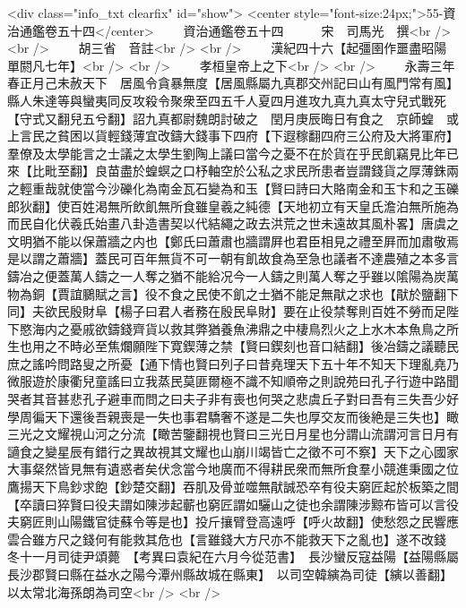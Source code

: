 <div class="info_txt clearfix" id="show">
<center style="font-size:24px;">55-資治通鑑卷五十四</center>
  　　資治通鑑卷五十四　　　宋　司馬光　撰<br />
<br />
　　胡三省　音註<br />
<br />
　　漢紀四十六【起彊圉作噩盡昭陽單閼凡七年】<br />
<br />
　　孝桓皇帝上之下<br />
<br />
　　永壽三年春正月己未赦天下　居風令貪暴無度【居風縣屬九真郡交州記曰山有風門常有風】縣人朱達等與蠻夷同反攻殺令聚衆至四五千人夏四月進攻九真九真太守兒式戰死【守式又翻兒五兮翻】詔九真都尉魏朗討破之　閏月庚辰晦日有食之　京師蝗　或上言民之貧困以貨輕錢薄宜改鑄大錢事下四府【下遐稼翻四府三公府及大將軍府】羣僚及太學能言之士議之太學生劉陶上議曰當今之憂不在於貨在乎民飢竊見比年已來【比毗至翻】良苗盡於蝗螟之口杼軸空於公私之求民所患者豈謂錢貨之厚薄銖兩之輕重哉就使當今沙礫化為南金瓦石變為和玉【賢曰詩曰大賂南金和玉卞和之玉礫郎狄翻】使百姓渇無所飲飢無所食雖皇羲之純德【天地初立有天皇氏澹泊無所施為而民自化伏羲氏始畫八卦造書契以代結繩之政去洪荒之世未遠故其風朴畧】唐虞之文明猶不能以保蕭牆之内也【鄭氏曰蕭肅也牆謂屛也君臣相見之禮至屛而加肅敬焉是以謂之蕭牆】蓋民可百年無貨不可一朝有飢故食為至急也議者不達農殖之本多言鑄冶之便蓋萬人鑄之一人奪之猶不能給况今一人鑄之則萬人奪之乎雖以隂陽為炭萬物為銅【賈誼鵩賦之言】役不食之民使不飢之士猶不能足無猒之求也【猒於鹽翻下同】夫欲民殷財阜【楊子曰君人者務在殷民阜財】要在止役禁奪則百姓不勞而足陛下愍海内之憂戚欲鑄錢齊貨以救其弊猶養魚沸鼎之中棲鳥烈火之上水木本魚鳥之所生也用之不時必至焦爛願陛下寛鍥薄之禁【賢曰鍥刻也音口結翻】後冶鑄之議聽民庶之謠吟問路叟之所憂【通下情也賢曰列子曰昔堯理天下五十年不知天下理亂堯乃微服遊於康衢兒童謠曰立我蒸民莫匪爾極不識不知順帝之則說苑曰孔子行遊中路聞哭者其音甚悲孔子避車而問之曰夫子非有喪也何哭之悲虞丘子對曰吾有三失吾少好學周徧天下還後吾親喪是一失也事君驕奢不遂是二失也厚交友而後絶是三失也】瞰三光之文耀視山河之分流【瞰苦鑒翻視也賢曰三光日月星也分謂山流謂河言日月有讁食之變星辰有錯行之異故視其文耀也山崩川竭皆亡之徵不可不察】天下之心國家大事粲然皆見無有遺惑者矣伏念當今地廣而不得耕民衆而無所食羣小競進秉國之位鷹揚天下鳥鈔求飽【鈔楚交翻】吞肌及骨並噬無猒誠恐卒有役夫窮匠起於板築之間【卒讀曰猝賢曰役夫謂如陳涉起蘄也窮匠謂如驪山之徒也余謂陳涉黥布皆可以言役夫窮匠則山陽鐵官徒蘇令等是也】投斤攘臂登高遠呼【呼火故翻】使愁怨之民響應雲合雖方尺之錢何有能救其危也【言雖錢大方尺亦不能救天下之亂也】遂不改錢　冬十一月司徒尹頌薨　【考異曰袁紀在六月今從范書】　長沙蠻反寇益陽【益陽縣屬長沙郡賢曰縣在益水之陽今潭州縣故城在縣東】　以司空韓縯為司徒【縯以善翻】以太常北海孫朗為司空<br />
<br />
